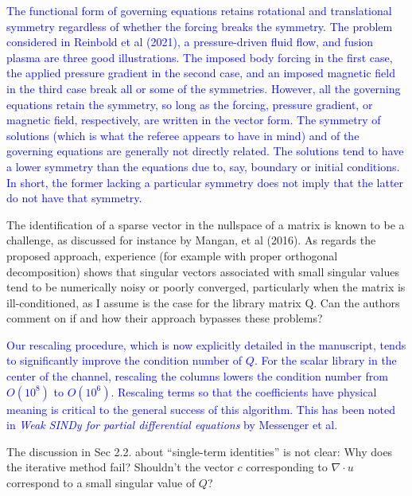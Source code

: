 \documentclass{article}
\newcommand{\response}{\textcolor{blue}}
\begin{document}
\medskip
\response{The functional form of governing equations retains rotational and translational symmetry regardless of whether the forcing breaks the symmetry. The problem considered in Reinbold et al (2021), a pressure-driven fluid flow, and fusion plasma are three good illustrations. The imposed body forcing in the first case, the applied pressure gradient in the second case, and an imposed magnetic field in the third case break all or some of the symmetries. However, all the governing equations retain the symmetry, so long as the forcing, pressure gradient, or magnetic field, respectively, are written in the vector form. The symmetry of solutions (which is what the referee appears to have in mind) and of the governing equations are generally not directly related. The solutions tend to have a lower symmetry than the equations due to, say, boundary or initial conditions. In short, the former lacking a particular symmetry does not imply that the latter do not have that symmetry.}

\medskip
The identification of a sparse vector in the nullspace
of a matrix is known to be a challenge, as discussed for instance by
Mangan, et al (2016).  As regards the proposed approach, experience
(for example with proper orthogonal decomposition) shows that singular
vectors associated with small singular values tend to be numerically
noisy or poorly converged, particularly when the matrix is
ill-conditioned, as I assume is the case for the library matrix Q.
Can the authors comment on if and how their approach bypasses these
problems?

\medskip
\response{
    Our rescaling procedure, which is now explicitly detailed in the manuscript, tends to significantly improve the condition number of $Q$. For the scalar library in the center of the channel, rescaling the columns lowers the condition number from $O( 10^{8})$ to $O( 10^6)$. Rescaling terms so that the coefficients have physical meaning is critical to the general success of this algorithm. This has been noted in \textit{Weak SINDy for partial differential equations} by Messenger et al.
}

\medskip
       The discussion in Sec 2.2. about “single-term
identities” is not clear:
Why does the iterative method fail?  Shouldn’t the
vector $c$ corresponding to $\nabla \cdot u$ correspond to a small
singular value of $Q$?
\end{document}
